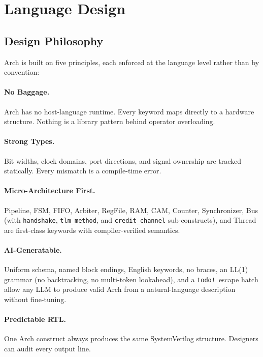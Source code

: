 \documentclass[manuscript]{acmart}
\begin{document}
\section{Language Design}\label{sec:design}

\subsection{Design Philosophy}

Arch is built on five principles, each enforced at the language level rather than by convention:

\paragraph{No Baggage.} Arch has no host-language runtime. Every keyword maps directly to a hardware structure. Nothing is a library pattern behind operator overloading.

\paragraph{Strong Types.} Bit widths, clock domains, port directions, and signal ownership are tracked statically. Every mismatch is a compile-time error.

\paragraph{Micro-Architecture First.} Pipeline, FSM, FIFO, Arbiter, RegFile, RAM, CAM, Counter, Synchronizer, Bus (with \texttt{handshake}, \texttt{tlm\_method}, and \texttt{credit\_channel} sub-constructs), and Thread are first-class keywords with compiler-verified semantics.

\paragraph{AI-Generatable.} Uniform schema, named block endings, English keywords, no braces, an LL(1) grammar (no backtracking, no multi-token lookahead), and a \texttt{todo!}\ escape hatch allow any LLM to produce valid Arch from a natural-language description without fine-tuning.

\paragraph{Predictable RTL.} One Arch construct always produces the same SystemVerilog structure. Designers can audit every output line.
\end{document}
